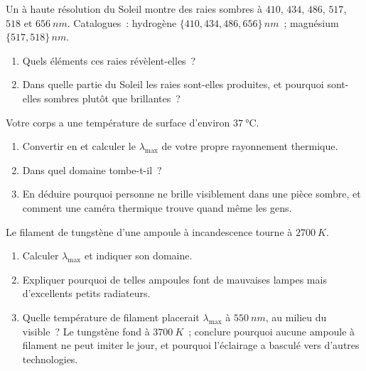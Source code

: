 \begin{exercise}[$\star\star$]\label{exo:g10:light-spectra:10}
Un  à haute résolution du Soleil montre des raies sombres à
$410$, $434$, $486$, $517$, $518$ et $\qty{656}{nm}$. Catalogues~:
hydrogène $\{410, 434, 486, 656\}\,\unit{nm}$~; magnésium
$\{517, 518\}\,\unit{nm}$.
\begin{enumerate}
  \item Quels éléments ces raies révèlent-elles~?
  \item Dans quelle partie du Soleil les raies sont-elles produites, et
        pourquoi sont-elles sombres plutôt que brillantes~?
\end{enumerate}
\end{exercise}

\begin{exercise}[$\star\star$]\label{exo:g10:light-spectra:11}
Votre corps a une température de surface d'environ
$\qty{37}{\degreeCelsius}$.
\begin{enumerate}
  \item Convertir en  et calculer le $\lambda_{\max}$ de votre
        propre rayonnement thermique.
  \item Dans quel domaine tombe-t-il~?
  \item En déduire pourquoi personne ne brille visiblement dans une
        pièce sombre, et comment une caméra thermique trouve quand
        même les gens.
\end{enumerate}
\end{exercise}

\begin{exercise}[$\star\star\star$]\label{exo:g10:light-spectra:12}
Le filament de tungstène d'une ampoule à incandescence tourne à
$\qty{2700}{K}$.
\begin{enumerate}
  \item Calculer $\lambda_{\max}$ et indiquer son domaine.
  \item Expliquer pourquoi de telles ampoules font de mauvaises lampes
        mais d'excellents petits radiateurs.
  \item Quelle température de filament placerait $\lambda_{\max}$ à
        $\qty{550}{nm}$, au milieu du visible~? Le tungstène fond à
        $\qty{3700}{K}$~; conclure pourquoi aucune ampoule à filament
        ne peut imiter le jour, et pourquoi l'éclairage a basculé vers
        d'autres technologies.
\end{enumerate}
\end{exercise}

